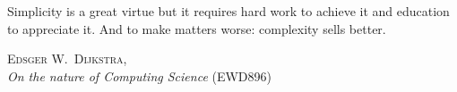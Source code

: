 \epigraph{%
  Simplicity is a great virtue but it requires hard work to achieve it and education to appreciate it.
  And to make matters worse: complexity sells better.%
}{%
	\textup{\textsc{Edsger W.\ Dijkstra}},\\
	\textup{\textit{On the nature of Computing Science} (EWD896)}%
}